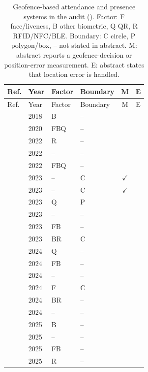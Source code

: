 \begin{longtable}{@{}llllcc@{}}
\caption{Geofence-based attendance and presence systems in the audit (\nAudit{}). Factor: F face/liveness, B other biometric, Q QR, R RFID/NFC/BLE. Boundary: C circle, P polygon/box, -- not stated in abstract. M: abstract reports a geofence-decision or position-error measurement. E: abstract states that location error is handled.}\label{tab:appendix}\\
\toprule Ref. & Year & Factor & Boundary & M & E \\ \midrule \endfirsthead
\toprule Ref. & Year & Factor & Boundary & M & E \\ \midrule \endhead
\cite{x2018hybrid} & 2018 & B & -- &  &  \\
\cite{shahab2020android} & 2020 & FBQ & -- &  &  \\
\cite{shinde2022design} & 2022 & R & -- &  &  \\
\cite{vianto2022sistem} & 2022 & -- & -- &  &  \\
\cite{x2022mobile} & 2022 & FBQ & -- &  &  \\
\cite{anonNonemonitoring} & 2023 & -- & C & $\checkmark$ &  \\
\cite{mughni2023teacher} & 2023 & -- & C & $\checkmark$ &  \\
\cite{nwabuwe2023fraud} & 2023 & Q & P &  &  \\
\cite{patil2023android} & 2023 & -- & -- &  &  \\
\cite{pawar2023automated} & 2023 & FB & -- &  &  \\
\cite{prabowo2023universal} & 2023 & BR & C &  &  \\
\cite{allacsta2024implementation} & 2024 & Q & -- &  &  \\
\cite{chauhan2024efficient} & 2024 & FB & -- &  &  \\
\cite{hope2024attendance} & 2024 & -- & -- &  &  \\
\cite{lubis2024development} & 2024 & F & C &  &  \\
\cite{tamboli2024attendance} & 2024 & BR & -- &  &  \\
\cite{x2024efficient} & 2024 & -- & -- &  &  \\
\cite{akila2025mobile} & 2025 & B & -- &  &  \\
\cite{bagussudirman2025implementasi} & 2025 & -- & -- &  &  \\
\cite{bhavsar2025unifence} & 2025 & FB & -- &  &  \\
\cite{bode2025advance} & 2025 & R & -- &  &  \\

\end{longtable}

